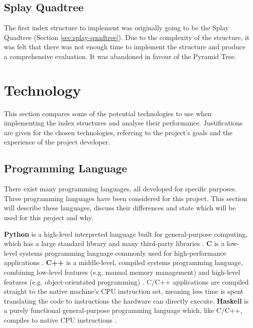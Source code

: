 \subsection{Splay Quadtree}

The first index structure to implement was originally going to be the Splay Quadtree (Section \ref{sec:splay-quadtree}). Due to the complexity of the structure, it was felt that there was not enough time to implement the structure and produce a comprehensive evaluation. It was abandoned in favour of the Pyramid Tree.

\section{Technology}

This section compares some of the potential technologies to use when implementing the index structures and analyse their performance. Justifications are given for the chosen technologies, referring to the project's goals and the experience of the project developer.

\subsection{Programming Language}

There exist many programming languages, all developed for specific purposes. Three programming languages have been considered for this project. This section will describe these languages, discuss their differences and state which will be used for this project and why.

\textbf{Python} is a high-level interpreted language built for general-purpose computing, which has a large standard library and many third-party libraries \cite{python}. \textbf{C} is a low-level systems programming language commonly used for high-performance applications \cite{c-lang}. \textbf{C++} is a middle-level, compiled systems programming language, combining low-level features (e.g. manual memory management) and high-level features (e.g. object-orientated programming) \cite{cpp}. C/C++ applications are compiled straight to the native machine's CPU instruction set, meaning less time is spent translating the code to instructions the hardware can directly execute. \textbf{Haskell} is a purely functional general-purpose programming language which, like C/C++, compiles to native CPU instructions \cite{haskell}.

